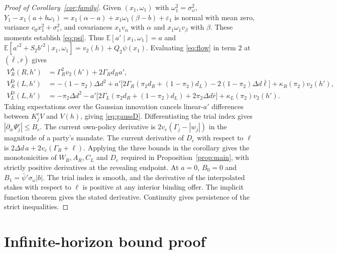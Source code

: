 \documentclass[11pt,letterpaper]{article}
\newcommand{\E}{\mathbb E}
\newcommand{\D}{\mathrm D}
\newcommand{\A}{\mathrm A}
\newcommand{\Dd}{\Delta d}
\begin{document}
\begin{proof}[Proof of Corollary~\ref{cor:family}]
Given $(x_1,\omega_1)$ with $\omega_1^2=\sigma_\omega^2$, $Y_1-x_1(a+b\omega_1)=x_1(\alpha-a)+x_1\omega_1(\beta-b)+\varepsilon_1$ is normal with mean zero, variance $c_0 x_1^2+\sigma_\varepsilon^2$, and covariances $x_1 v_\alpha$ with $\alpha$ and $x_1\omega_1 v_\beta$ with $\beta$. These moments establish \eqref{eq:psi}. Thus $\E[a'\mid x_1,\omega_1]=a$ and $\E[a'^2+S_2 b'^2\mid x_1,\omega_1]=v_2(h)+Q_2\psi(x_1)$. Evaluating \eqref{eq:flow} in term $2$ at $(\bar\ell,\bar r)$ gives
\begin{align*}
 V_R^\A(R,h') &= \Gamma_R^2 v_2(h')+2\Gamma_R d_R a',\\
 V_R^\D(L,h') &= -(1-\pi_2)\Dd^2+a'\big[2\Gamma_R(\pi_2 d_R+(1-\pi_2)d_L)-2(1-\pi_2)\Dd\bar\ell\big]+\kappa_R(\pi_2)v_2(h'),\\
 V_L^\D(L,h') &= -\pi_2\Dd^2-a'\big[2\Gamma_L(\pi_2 d_R+(1-\pi_2)d_L)+2\pi_2\Dd\bar r\big]+\kappa_L(\pi_2)v_2(h').
\end{align*}
Taking expectations over the Gaussian innovation cancels linear-$a'$ differences between $K_j^eV$ and $V(h)$, giving \eqref{eq:gaussD}. Differentiating the trial index gives $|\partial_w\Psi_j^e|\le B_e$. The current own-policy derivative is $2v_e(\Gamma_j-|w_j|)$ in the magnitude of a party's mandate. The current derivative of $D_e$ with respect to $\ell$ is $2\Dd\,a+2v_e(\Gamma_R+\ell)$. Applying the three bounds in the corollary gives the monotonicities of $W_R,A_R,C_L$ and $D_e$ required in Proposition~\ref{prop:main}, with strictly positive derivatives at the revealing endpoint. At $a=0$, $B_0=0$ and $B_1=\bar\psi'\sigma_\omega|b|$. The trial index is smooth, and the derivative of the interpolated stakes with respect to $\ell$ is positive at any interior binding offer. The implicit function theorem gives the stated derivative. Continuity gives persistence of the strict inequalities.
\end{proof}

\section{Infinite-horizon bound proof}\label{app:infproof}
\end{document}
